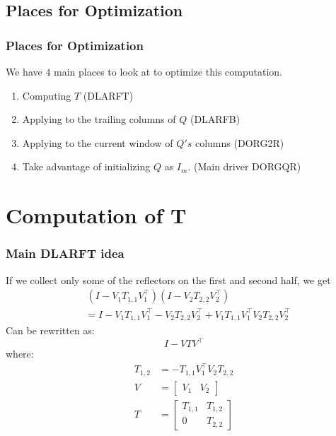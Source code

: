 \documentclass[12pt]{beamer}
\begin{document}
    \subsection{Places for Optimization}
    \begin{frame}
        \frametitle{Places for Optimization}
        We have $4$ main places to look at to optimize this computation.
        \begin{enumerate}
            \item Computing $T$ (DLARFT)
            \item Applying to the trailing columns of $Q$ (DLARFB)
            \item Applying to the current window of $Q's$ columns (DORG2R)
            \item Take advantage of initializing $Q$ as $I_m$. (Main driver DORGQR)
        \end{enumerate}
    \end{frame}
    \section{Computation of T}
    \begin{frame}
        \frametitle{Main DLARFT idea}
        If we collect only some of the reflectors on the first and second half, we get
        \begin{align*}
            &\,(I - V_1T_{1,1}V_1^\top)(I - V_2T_{2,2}V_2^\top) \\
            &= I - V_1T_{1,1}V_1^\top - V_2T_{2,2}V_2^\top + V_1T_{1,1}V_1^\top V_2T_{2,2}V_2^\top
        \end{align*}
        Can be rewritten as:
        $$
            I - VTV^\top
        $$
        where:
        \begin{align*}
            T_{1,2} &= -T_{1,1}V_1^\top V_2T_{2,2} \\
            V &= \begin{bmatrix}
                V_1 & V_2
            \end{bmatrix}\\
            T &= \begin{bmatrix}
                T_{1,1} & T_{1,2} \\
                0       & T_{2,2}
            \end{bmatrix}
        \end{align*}
    \end{frame}
\end{document}
